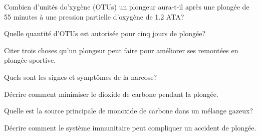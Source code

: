 \documentclass[english,12pt,a4paper]{article}
\begin{document}
\begin{outline}
		\1 Combien d'unités do'xygène (OTUs) un plongeur aura-t-il après une plongée de 55 minutes à une pression partielle d'oxygène de 1.2 ATA?
			\2[] \hspace{-2em}\hrulefill
			\2[] \hspace{-2em}\hrulefill

		\1 Quelle quantité d'OTUs est autorisée pour cinq jours de plongée?
			\2[] \hspace{-2em}\hrulefill

		\1 Citer trois choses qu'un plongeur peut faire pour améliorer ses remontées en plongée sportive.
			\2[] \hspace{-2em}\hrulefill
			\2[] \hspace{-2em}\hrulefill
			\2[] \hspace{-2em}\hrulefill

		\1 Quels sont les signes et symptômes de la narcose?
			\2[] \hspace{-2em}\hrulefill
			\2[] \hspace{-2em}\hrulefill
			\2[] \hspace{-2em}\hrulefill

		\1 Décrire comment minimiser le dioxide de carbone pendant la plongée.
			\2[] \hspace{-2em}\hrulefill
			\2[] \hspace{-2em}\hrulefill
			\2[] \hspace{-2em}\hrulefill
			\2[] \hspace{-2em}\hrulefill

		\1 Quelle est la source principale de monoxide de carbone dans un mélange gazeux?
			\2[] \hspace{-2em}\hrulefill
			\2[] \hspace{-2em}\hrulefill

		\1 Décrire comment le système immunitaire peut compliquer un accident de plongée.
			\2[] \hspace{-2em}\hrulefill
			\2[] \hspace{-2em}\hrulefill
			\2[] \hspace{-2em}\hrulefill
			\2[] \hspace{-2em}\hrulefill
	\end{outline}
	\pagebreak

\end{document}
